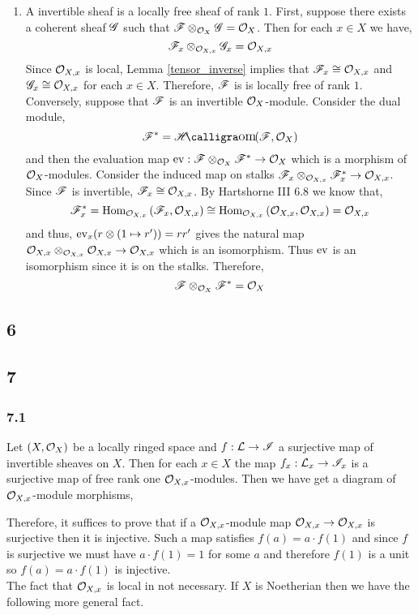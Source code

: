 \documentclass[12pt]{article}
\begin{document}
\begin{enumerate}
\item A invertible sheaf is a locally free sheaf of rank $1$. First, suppose there exists a coherent sheaf $\mathscr{G}$ such that $\mathscr{F} \otimes_{\mathcal{O}_{X}} \mathscr{G} = \mathcal{O}_{X}$. Then for each $x \in X$ we have,
\[ \mathscr{F}_x \otimes_{\mathcal{O}_{X, x}} \mathscr{G}_x = \mathcal{O}_{X, x} \]
Since $\mathcal{O}_{X, x}$ is local, Lemma \ref{tensor_inverse} implies that $\mathscr{F}_x \cong \mathcal{O}_{X, x}$ and $\mathscr{G}_x \cong \mathcal{O}_{X, x}$ for each $x \in X$. Therefore, $\mathscr{F}$ is is locally free of rank $1$.
\bigskip\\
Conversely, suppose that $\mathscr{F}$ is an invertible $\mathcal{O}_{X}$-module. Consider the dual module,
\[ \F^* = \shHom{}{\F}{\struct{X}} \]
and then the evaluation map $\mathrm{ev} : \mathscr{F} \otimes_{\mathcal{O}_{X}} \mathscr{F}^* \to \mathcal{O}_{X}$ which is a morphism of $\mathcal{O}_{X}$-modules.
Consider the induced map on stalks $\mathscr{F}_x \otimes_{\mathcal{O}_{X, x}} \mathscr{F}^*_x \to \mathcal{O}_{X, x}$. Since $\mathscr{F}$ is invertible, $\mathscr{F}_x \cong \mathcal{O}_{X, x}$. By Hartshorne III 6.8 we know that,
\[ \mathscr{F}^*_x = \text{Hom}_{\mathcal{O}_{X, x}}\left( \mathscr{F}_x, \mathcal{O}_{X, x} \right) \cong \text{Hom}_{\mathcal{O}_{X, x}}\left( \mathcal{O}_{X, x}, \mathcal{O}_{X, x} \right) = \mathcal{O}_{X, x} \] and thus, $\mathrm{ev}_x(r \otimes (1 \mapsto r')) = rr'$ gives the natural map $\mathcal{O}_{X, x} \otimes_{\mathcal{O}_{X, x}} \mathcal{O}_{X, x} \to \mathcal{O}_{X, x}$ which is an isomorphism. Thus $\mathrm{ev}$ is an isomorphism since it is on the stalks. Therefore, 
\[ \mathscr{F} \otimes_{\mathcal{O}_{X}} \mathscr{F}^* = \mathcal{O}_{X} \]
\end{enumerate}

\subsection{6}

\subsection{7}

\subsubsection{7.1}

Let $(X, \mathcal{O}_{X})$ be a locally ringed space and $f : \mathcal{L} \to \mathscr{I}$ a surjective map of invertible sheaves on $X$. Then for each $x \in X$ the map $f_x : \mathcal{L}_x \to \mathscr{I}_x$ is a surjective map of free rank one $\mathcal{O}_{X, x}$-modules. Then we have get a diagram of $\mathcal{O}_{X, x}$-module morphisms,
\begin{center}
\end{center}
Therefore, it suffices to prove that if a $\mathcal{O}_{X, x}$-module map $\mathcal{O}_{X, x} \to \mathcal{O}_{X, x}$ is surjective then it is injective. Such a map satisfies $f(a) = a \cdot f(1)$ and since $f$ is surjective we must have $a \cdot f(1) = 1$ for some $a$ and therefore $f(1)$ is a unit so $f(a) = a \cdot f(1)$ is injective.
\bigskip\\
The fact that $\mathcal{O}_{X, x}$ is local in not necessary. If $X$ is Noetherian then we have the following more general fact.
\end{document}
